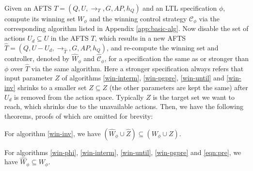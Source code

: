 Given an AFTS $ T = (Q,U,\rightarrow_T,G,AP,h_Q) $ and an LTL specification $ \phi $, compute its winning set $ W_{\phi} $ and the winning control strategy $ \mathcal{C}_{\phi} $  via the corresponding algorithm listed in Appendix \ref{app:basic-alg}. Now disable the set of actions $ U_d \subseteq U$ in the AFTS $ T $, which results in a new AFTS $ \widehat{T} = (Q,U-U_d,\rightarrow_{\widehat{T}},G,AP,h_Q) $, and re-compute the winning set and controller, denoted by $ \widehat{W}_{\phi} $ and $ \widehat{\mathcal{C}}_{\phi} $, for a specification the same as or stronger than $ \phi $ over $ \widehat{T} $ via the same algorithm. Here a stronger specification always refers that input parameter $ Z $ of algorithms \eqref{win-interm}, \eqref{win-pgpre}, \eqref{win-until} and  \eqref{win-inv} shrinks to a smaller set $ \widehat{Z}\subseteq Z $ (the other parameters are kept the same) after $ U_d $ is removed from the action space. Typically $ Z $ is the target set we want to reach, which shrinks due to the unavailable actions. 
Then, we have the following theorems, proofs of which are omitted for brevity:

\begin{theorem}
For algorithm \eqref{win-inv}, we have $ ( \widehat{W}_{\phi}\cup \widehat{Z}) \subseteq ( W_\phi \cup Z) $.\label{thm: inv-set}
\end{theorem}


\begin{theorem}
For algorithms \eqref{win-phi}, \eqref{win-interm}, \eqref{win-until}, \eqref{win-pgpre} and \eqref{eqn:pre}, we have $ \widehat{W}_\phi \subseteq W_\phi $.

	\label{thm: 1} 
\end{theorem}

